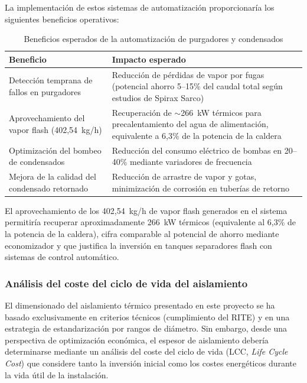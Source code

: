 La implementación de estos sistemas de automatización proporcionaría los siguientes beneficios operativos:

\begin{table}[H]
	\centering
	\caption{Beneficios esperados de la automatización de purgadores y condensados}
	\label{tab:trabajo-futuro-purgadores-beneficios}
	\begin{tabular}{p{6cm}p{7cm}}
		\toprule
		\textbf{Beneficio}                            & \textbf{Impacto esperado}                                                                                                              \\
		\midrule
		Detección temprana de fallos en purgadores    & Reducción de pérdidas de vapor por fugas (potencial ahorro 5--15\% del caudal total según estudios de Spirax Sarco)                    \\
		\midrule
		Aprovechamiento del vapor flash (402,54~kg/h) & Recuperación de $\sim$266~kW térmicos para precalentamiento del agua de alimentación, equivalente a 6,3\% de la potencia de la caldera \\
		\midrule
		Optimización del bombeo de condensados        & Reducción del consumo eléctrico de bombas en 20--40\% mediante variadores de frecuencia                                                \\
		\midrule
		Mejora de la calidad del condensado retornado & Reducción de arrastre de vapor y gotas, minimización de corrosión en tuberías de retorno                                               \\
		\bottomrule
	\end{tabular}
\end{table}

El aprovechamiento de los 402,54~kg/h de vapor flash generados en el sistema permitiría recuperar aproximadamente 266~kW térmicos (equivalente al 6,3\% de la potencia de la caldera), cifra comparable al potencial de ahorro mediante economizador y que justifica la inversión en tanques separadores flash con sistemas de control automático.

\subsubsection{Análisis del coste del ciclo de vida del aislamiento}
\label{subsubsec:trabajo-futuro-lcc-aislamiento}

El dimensionado del aislamiento térmico presentado en este proyecto se ha basado exclusivamente en criterios técnicos (cumplimiento del RITE) y en una estrategia de estandarización por rangos de diámetro. Sin embargo, desde una perspectiva de optimización económica, el espesor de aislamiento debería determinarse mediante un análisis del coste del ciclo de vida (LCC, \textit{Life Cycle Cost}) que considere tanto la inversión inicial como los costes energéticos durante la vida útil de la instalación.

